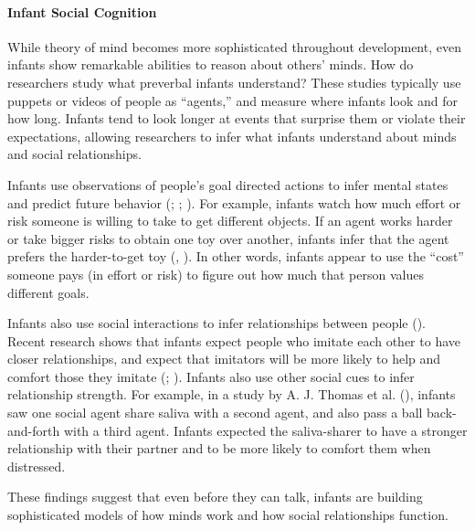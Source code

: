 \documentclass[
]{krantz}
\begin{document}
\paragraph*{Infant Social Cognition}\label{infant-social-cognition}

While theory of mind becomes more sophisticated throughout development, even infants show remarkable abilities to reason about others' minds. How do researchers study what preverbal infants understand? These studies typically use puppets or videos of people as ``agents,'' and measure where infants look and for how long. Infants tend to look longer at events that surprise them or violate their expectations, allowing researchers to infer what infants understand about minds and social relationships.

Infants use observations of people's goal directed actions to infer mental states and predict future behavior (; ; ). For example, infants watch how much effort or risk someone is willing to take to get different objects. If an agent works harder or take bigger risks to obtain one toy over another, infants infer that the agent prefers the harder-to-get toy (, ). In other words, infants appear to use the ``cost'' someone pays (in effort or risk) to figure out how much that person values different goals.

Infants also use social interactions to infer relationships between people (). Recent research shows that infants expect people who imitate each other to have closer relationships, and expect that imitators will be more likely to help and comfort those they imitate (; ). Infants also use other social cues to infer relationship strength. For example, in a study by A. J. Thomas et al. (), infants saw one social agent share saliva with a second agent, and also pass a ball back-and-forth with a third agent. Infants expected the saliva-sharer to have a stronger relationship with their partner and to be more likely to comfort them when distressed.

These findings suggest that even before they can talk, infants are building sophisticated models of how minds work and how social relationships function.
\end{document}
